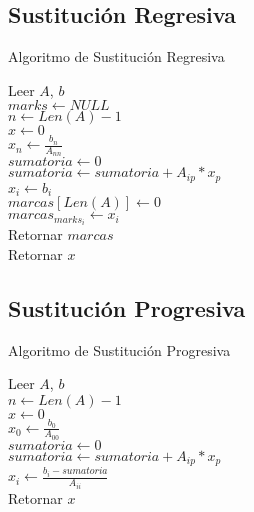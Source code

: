 \documentclass[12pt]{article}
\begin{document}
        \subsection{Sustitución Regresiva}
        
        \begin{algorithm}[H]
            \caption{Algoritmo de Sustitución Regresiva}
            Leer $A$, $b$ \\
            $marks \leftarrow NULL$ \\
            $n \leftarrow Len(A) - 1$ \\ 
            $x \leftarrow 0$ \\
            $x_{n} \leftarrow \frac{b_n}{A_{nn}}$ \\
            {
                $sumatoria \leftarrow 0$ \\
                {
                    $sumatoria \leftarrow sumatoria + A_{ip}*x_{p}$\\
                }
                $x_{i} \leftarrow b_{i}$\\
            }
            {
                $marcas[Len(A)] \leftarrow 0$\\
                {
                    $marcas_{marks_{i}} \leftarrow x_{i}$\\
                }
                Retornar $marcas$\\
            }
            Retornar $x$\\
        \end{algorithm}

        \subsection{Sustitución Progresiva}
        
        \begin{algorithm}[H]
            \caption{Algoritmo de Sustitución Progresiva}
            Leer $A$, $b$ \\
            $n \leftarrow Len(A) - 1$\\
            $x \leftarrow 0$\\
            $x_0 \leftarrow \frac{b_0}{A_00}$\\
            {
                $sumatoria \leftarrow 0$\\
                {
                    $sumatoria \leftarrow sumatoria + A_{ip}*x_{p}$\\
                }
                $x_{i} \leftarrow \frac{b_{i} - sumatoria}{A_{ii}}$\\
            }
            Retornar $x$\\
        \end{algorithm}
\end{document}
